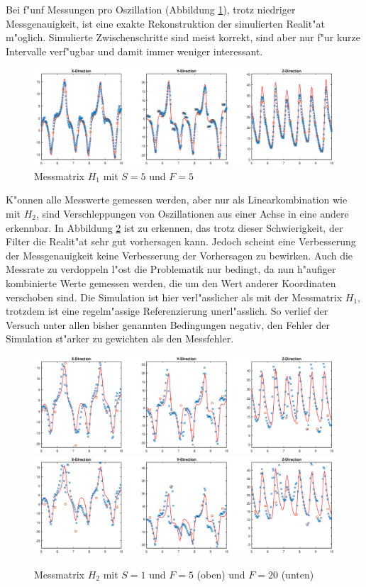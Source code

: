 \begin{refsection}
Bei f"unf Messungen pro Oszillation (Abbildung \ref{kalman:H1S5}), trotz niedriger Messgenauigkeit, ist eine exakte Rekonstruktion der simulierten Realit"at m"oglich. Simulierte Zwischenschritte sind meist korrekt, sind aber nur f"ur kurze Intervalle verf"ugbar und damit immer weniger interessant.
\begin{figure}
\centering
\includegraphics[width=\hsize]{kalman/figures/H1R05S5.eps}
\caption{Messmatrix $H_{1}$ mit $S=5$ und $F=5$}
\label{kalman:H1S5}
\end{figure}

K"onnen alle Messwerte gemessen werden, aber nur als Linearkombination wie mit $H_{2}$, sind Verschleppungen von Oszillationen aus einer Achse in eine andere erkennbar. In Abbildung \ref{kalman:H2S1} ist zu erkennen, das trotz dieser Schwierigkeit, der Filter die Realit"at sehr gut vorhersagen kann. Jedoch scheint eine Verbesserung der Messgenauigkeit keine Verbesserung der Vorhersagen zu bewirken.
Auch die Messrate zu verdoppeln l"ost die Problematik nur bedingt, da nun h"aufiger kombinierte Werte gemessen werden, die um den Wert anderer Koordinaten verschoben sind. Die Simulation ist hier verl"asslicher als mit der Messmatrix $H_{1}$, trotzdem ist eine regelm"assige Referenzierung unerl"asslich. So verlief der Versuch unter allen bisher genannten Bedingungen negativ, den Fehler der Simulation st"arker zu gewichten als den Messfehler.

\begin{figure}
\centering
\includegraphics[width=\hsize]{kalman/figures/H2R05S1.eps}
\includegraphics[width=\hsize]{kalman/figures/H2R20S1.eps}
\caption{Messmatrix $H_{2}$ mit $S=1$ und $F=5$ (oben) und $F=20$ (unten)}
\label{kalman:H2S1}
\end{figure}


\end{refsection}
